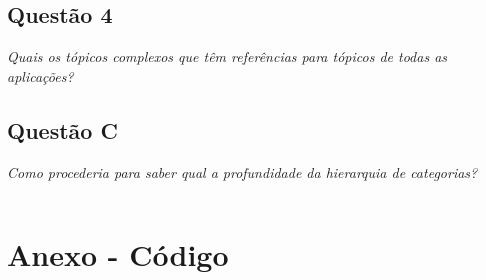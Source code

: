\documentclass[a4paper,12pt]{article}
\begin{document}
\subsection{Questão 4}

	\emph{Quais os tópicos complexos que têm referências para tópicos de todas as aplicações?}\\

\subsection{Questão C}

	\emph{Como procederia para saber qual a profundidade da hierarquia de categorias?}\\

	\inputminted{sql}{sql3.sql}

\section{Anexo - Código}


	\inputminted{sql}{sql3.sql}
\end{document}
